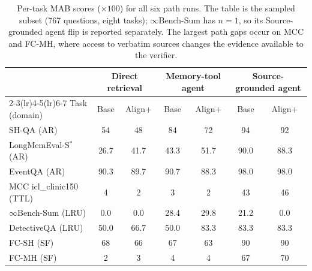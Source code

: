 \begin{table}[t]
\centering
\footnotesize
\begin{tabular}{@{}lcccccc@{}}
\toprule
 & \multicolumn{2}{c}{Direct retrieval} & \multicolumn{2}{c}{Memory-tool agent} & \multicolumn{2}{c}{Source-grounded agent} \\
\cmidrule(lr){2-3}\cmidrule(lr){4-5}\cmidrule(lr){6-7}
Task (domain) & Base & Align+ & Base & Align+ & Base & Align+ \\
\midrule
SH-QA (AR) & 54 & 48 & 84 & 72 & 94 & 92 \\
LongMemEval-S$^{*}$ (AR) & 26.7 & 41.7 & 43.3 & 51.7 & 90.0 & 88.3 \\
EventQA (AR) & 90.3 & 89.7 & 90.7 & 88.3 & 98.0 & 98.0 \\
MCC icl\_clinic150 (TTL) & 4 & 2 & 3 & 2 & 43 & 46 \\
$\infty$Bench-Sum (LRU) & 0.0 & 0.0 & 28.4 & 29.8 & 21.2 & 0.0 \\
DetectiveQA (LRU) & 50.0 & 66.7 & 50.0 & 83.3 & 83.3 & 83.3 \\
FC-SH (SF) & 68 & 66 & 67 & 63 & 90 & 90 \\
FC-MH (SF) & 2 & 3 & 4 & 4 & 67 & 70 \\
\bottomrule
\end{tabular}
\caption{Per-task MAB scores ($\times100$) for all six path runs. The table is the sampled subset (767 questions, eight tasks); $\infty$Bench-Sum has $n=1$, so its Source-grounded agent flip is reported separately. The largest path gaps occur on MCC and FC-MH, where access to verbatim sources changes the evidence available to the verifier.}
\label{tab:mab-per-task}
\end{table}
